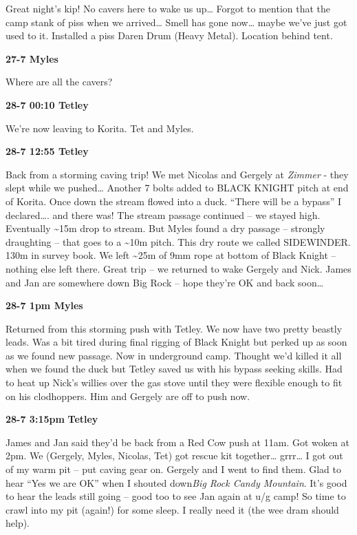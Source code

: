 Great night's kip! No cavers here to wake us up\ldots{} Forgot to
mention that the camp stank of piss when we arrived\ldots{} Smell has
gone now\ldots{} maybe we've just got used to it. Installed a piss Daren
Drum (Heavy Metal). Location behind tent.

\textbf{27-7 Myles}

Where are all the cavers?

\textbf{28-7 00:10 Tetley}

We're now leaving to Korita. Tet and Myles.

\textbf{28-7 12:55 Tetley}

Back from a storming caving trip! We met Nicolas and Gergely at
\emph{Zimmer} - they slept while we pushed\ldots{} Another 7 bolts added
to BLACK KNIGHT pitch at end of Korita. Once down the stream flowed into
a duck. ``There will be a bypass'' I declared\ldots{}. and there was!
The stream passage continued -- we stayed high. Eventually
\textasciitilde{}15m drop to stream. But Myles found a dry passage --
strongly draughting -- that goes to a \textasciitilde{}10m pitch. This
dry route we called SIDEWINDER. 130m in survey book. We left
\textasciitilde{}25m of 9mm rope at bottom of Black Knight -- nothing
else left there. Great trip -- we returned to wake Gergely and Nick.
James and Jan are somewhere down Big Rock -- hope they're OK and back
soon\ldots{}

\textbf{28-7 1pm Myles}

Returned from this storming push with Tetley. We now have two pretty
beastly leads. Was a bit tired during final rigging of Black Knight but
perked up as soon as we found new passage. Now in underground camp.
Thought we'd killed it all when we found the duck but Tetley saved us
with his bypass seeking skills. Had to heat up Nick's willies over the
gas stove until they were flexible enough to fit on his clodhoppers. Him
and Gergely are off to push now.

\textbf{28-7 3:15pm} \textbf{Tetley}

James and Jan said they'd be back from a Red Cow push at 11am. Got woken
at 2pm. We (Gergely, Myles, Nicolas, Tet) got rescue kit
together\ldots{} grrr\ldots{} I got out of my warm pit -- put caving
gear on. Gergely and I went to find them. Glad to hear ``Yes we are OK''
when I shouted down\emph{Big Rock Candy Mountain}. It's good to hear the
leads still going -- good too to see Jan again at u/g camp! So time to
crawl into my pit (again!) for some sleep. I really need it (the wee
dram should help).

